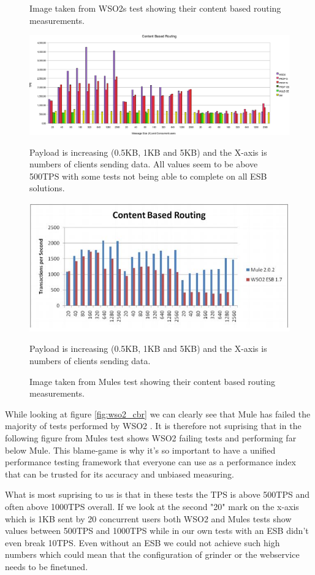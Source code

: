 \begin{figure}[H]
	\caption{Image taken from WSO2s test \cite{Perera07R3} showing their content based routing measurements.}
	\centerline{\includegraphics[scale=0.43]{img/WSO2_cbr_chart}}
	\label{fig:wso2_cbr}
	Payload is increasing (0.5KB, 1KB and 5KB) and the X-axis is numbers of clients sending data. 
	All values seem to be above 500TPS with some tests not being able to complete on all ESB solutions.

	\caption{Image taken from Mules test \cite{mulesoft08} showing their content based routing measurements.}
	\centerline{\includegraphics[scale=1]{img/MULE_cbr_chart}}
	\label{fig:mule_cbr}
	Payload is increasing (0.5KB, 1KB and 5KB) and the X-axis is numbers of clients sending data. 
\end{figure}
While looking at figure \ref{fig:wso2_cbr} we can clearly see that Mule has failed the majority of tests performed by WSO2 \cite{Perera07R3}. 
It is therefore not suprising that in the following figure from Mules test \cite{mulesoft08} shows WSO2 failing tests and performing far below Mule.
This blame-game is why it's so important to have a unified performance testing framework that everyone can use as a performance index that can be trusted for its accuracy and unbiased measuring.

What is most suprising to us is that in these tests the TPS is above 500TPS and often above 1000TPS overall. 
If we look at the second "20" mark on the x-axis which is 1KB sent by 20 concurrent users both WSO2 and Mules tests show values between 500TPS and 1000TPS while in our own tests with an ESB didn't even break 10TPS.
Even without an ESB we could not achieve such high numbers which could mean that the configuration of grinder or the webservice needs to be finetuned.

